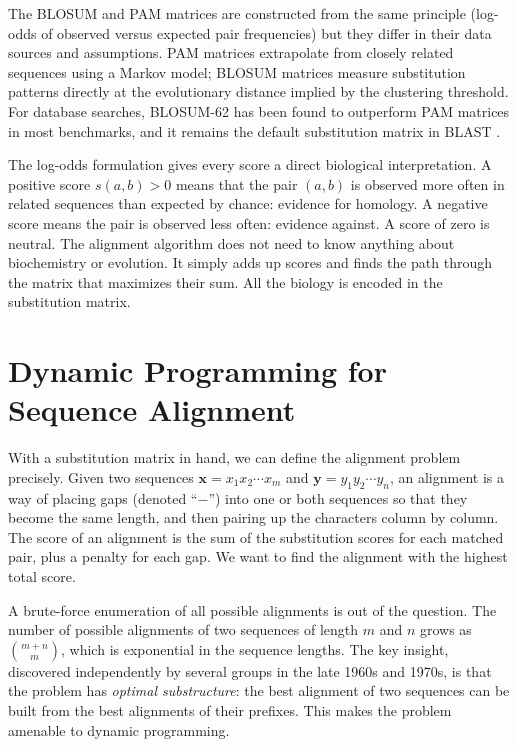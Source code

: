 The BLOSUM and PAM matrices are constructed from the same principle (log-odds of observed versus expected pair frequencies) but they differ in their data sources and assumptions. PAM matrices extrapolate from closely related sequences using a Markov model; BLOSUM matrices measure substitution patterns directly at the evolutionary distance implied by the clustering threshold. For database searches, BLOSUM-62 has been found to outperform PAM matrices in most benchmarks, and it remains the default substitution matrix in BLAST \cite{altschul1997}.

The log-odds formulation gives every score a direct biological interpretation. A positive score $s(a,b) > 0$ means that the pair $(a,b)$ is observed more often in related sequences than expected by chance: evidence for homology. A negative score means the pair is observed less often: evidence against. A score of zero is neutral. The alignment algorithm does not need to know anything about biochemistry or evolution. It simply adds up scores and finds the path through the matrix that maximizes their sum. All the biology is encoded in the substitution matrix.


\section{Dynamic Programming for Sequence Alignment}
\label{sec:dynamic-programming}

With a substitution matrix in hand, we can define the alignment problem precisely. Given two sequences $\mathbf{x} = x_1 x_2 \cdots x_m$ and $\mathbf{y} = y_1 y_2 \cdots y_n$, an alignment is a way of placing gaps (denoted ``$-$'') into one or both sequences so that they become the same length, and then pairing up the characters column by column. The score of an alignment is the sum of the substitution scores for each matched pair, plus a penalty for each gap. We want to find the alignment with the highest total score.

A brute-force enumeration of all possible alignments is out of the question. The number of possible alignments of two sequences of length $m$ and $n$ grows as $\binom{m+n}{m}$, which is exponential in the sequence lengths. The key insight, discovered independently by several groups in the late 1960s and 1970s, is that the problem has \emph{optimal substructure}: the best alignment of two sequences can be built from the best alignments of their prefixes. This makes the problem amenable to dynamic programming.


